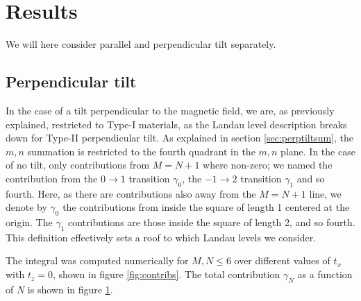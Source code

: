 \section{Results}
We will here consider parallel and perpendicular tilt separately.

\subsection{Perpendicular tilt}
In the case of a tilt perpendicular to the magnetic field, we are, as previously explained, restricted to Type-I materials, as the Landau level description breaks down for Type-II perpendicular tilt.
As explained in section \ref{sec:perptiltsum}, the \( m,n \) summation is restricted to the fourth quadrant in the \( m,n \) plane.
In the case of no tilt, only contributions from \( M = N + 1 \) where non-zero;
we named the contribution from the \( 0\to 1 \) transition \( \gamma_0 \), the \( -1\to 2 \) transition \( \gamma_1 \) and so fourth.
Here, as there are contributions also away from the \( M=N + 1 \) line, we denote by \( \gamma_0 \) the contributions from inside the square of length 1 centered at the origin.
The \( \gamma_1 \) contributions are those inside the square of length 2, and so fourth.
This definition effectively sets a roof to which Landau levels we consider.

The integral was computed numerically for \( M,N \leq 6 \) over different values of \( t_x \) with \( t_z = 0 \), shown in figure \ref{fig:contribs}.
The total contribution \( \gamma_N \) as a function of \( N \) is shown in figure \ref{fig:total_contribs}.

\begin{figure}[ht]
  \centering
  \caption{\label{fig:total_contribs} }
\end{figure}



